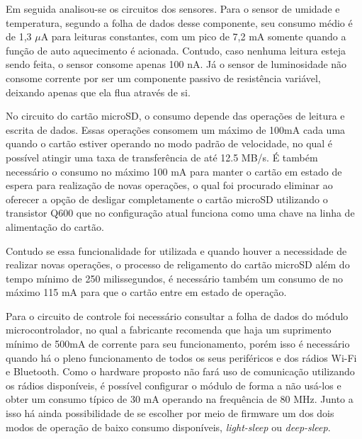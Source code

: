 Em seguida analisou-se os circuitos dos sensores. Para o sensor de umidade e temperatura, segundo a folha de dados desse componente, seu consumo médio é de 1,3 $\mu$A para leituras constantes, com um pico de 7,2 mA somente quando a função de auto aquecimento é acionada. Contudo, caso nenhuma leitura esteja sendo feita, o sensor consome apenas 100 nA. Já o sensor de luminosidade não consome corrente por ser um componente passivo de resistência variável, deixando apenas que ela flua através de si.

No circuito do cartão microSD, o consumo depende das operações de leitura e escrita de dados. Essas operações consomem um máximo de 100mA cada uma quando o cartão estiver operando no modo padrão de velocidade, no qual é possível atingir uma taxa de transferência de até 12.5 MB/s. É também necessário o consumo no máximo 100 mA para manter o cartão em estado de espera para realização de novas operações, o qual foi procurado eliminar ao oferecer a opção de desligar completamente o cartão microSD utilizando o transistor Q600 que no configuração atual funciona como uma chave na linha de alimentação do cartão.

Contudo se essa funcionalidade for utilizada e quando houver a necessidade de realizar novas operações, o processo de religamento do cartão microSD além do tempo mínimo de 250 milissegundos, é necessário também um consumo de no máximo 115 mA para que o cartão entre em estado de operação. 

Para o circuito de controle foi necessário consultar a folha de dados do módulo microcontrolador, no qual a fabricante recomenda que haja um suprimento mínimo de 500mA de corrente para seu funcionamento, porém isso é necessário quando há o pleno funcionamento de todos os seus periféricos e dos rádios Wi-Fi e Bluetooth. Como o hardware proposto não fará uso de comunicação utilizando os rádios disponíveis, é possível configurar o módulo de forma a não usá-los e obter um consumo típico de 30 mA operando na frequência de 80 MHz. Junto a isso há ainda possibilidade de se escolher por meio de firmware um dos dois modos de operação de baixo consumo disponíveis, \textit{light-sleep} ou \textit{deep-sleep}. 

